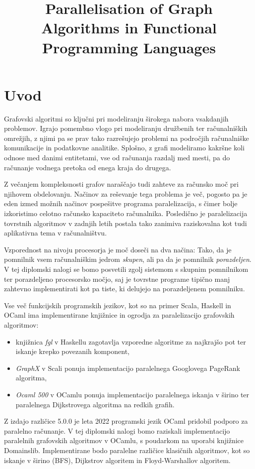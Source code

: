 \documentclass[fin1, tisk]{fmfdelo}
\title{Parallelisation of Graph Algorithms in Functional Programming Languages}
\begin{document}
\section{Uvod}

Grafovski algoritmi so ključni pri modeliranju širokega nabora vsakdanjih problemov.
Igrajo pomembno vlogo pri modeliranju družbenih ter računalniških omrežjih, z njimi pa se prav tako razrešujejo 
problemi na področjih računalniške komunikacije in podatkovne analitike. Splošno, z grafi  modeliramo kakršne 
koli odnose med danimi entitetami, vse od računanja razdalj med mesti, pa do računanje vodnega pretoka
od enega kraja do drugega.

Z večanjem kompleksnosti grafov naraščajo tudi zahteve za računsko moč pri njihovem obdelovanju.
Načinov za reševanje tega problema je več, pogosto pa je eden izmed možnih načinov pospešitve programa paralelizacija,
s čimer bolje izkoristimo celotno računsko kapaciteto računalnika. Posledično je paralelizacija tovrstnih algoritmov
v zadnjih letih postala tako zanimiva raziskovalna kot tudi aplikativna tema v računalništvu.

Vzporednost na nivoju procesorja je moč doseči na dva načina: 
Tako, da je pomnilnik vsem računalniškim jedrom \textit{skupen}, ali pa da je pomnilnik \textit{porazdeljen}. 
V tej diplomski nalogi se bomo posvetili zgolj sistemom s skupnim pomnilnikom ter porazdeljeno procesorsko močjo, 
saj je tovrstne programe tipično manj zahtevno implementirati kot pa tiste, ki delujejo na porazdeljenem pomnilniku.

Vse več funkcijskih programskih jezikov, kot so na primer Scala, Haskell in OCaml ima implementirane knjižnice
in ogrodja za paralelizacijo grafovskih algoritmov:
\begin{itemize}
    \item knjižnica \textit{fgl} v Haskellu \cite{haskell_fgl} zagotavlja vzporedne algoritme za najkrajšo pot 
    ter iskanje krepko povezanih komponent,
    \item \textit{GraphX} v Scali \cite{graphx} ponuja implementacijo paralelnega Googlovega PageRank algoritma,
    \item \textit{Ocaml 500} v OCamlu \cite{ocaml_multicore_500} ponuja implementacijo paralelnega iskanja v širino ter paralelnega Dijkstrovega algoritma na redkih grafih.
\end{itemize}

Z izdajo različice 5.0.0 je leta 2022 programski jezik OCaml pridobil podporo za paralelno računanje.
V tej diplomski nalogi bomo raziskali implementacijo paralelnih grafovskih algoritmov v OCamlu, s
poudarkom na uporabi knjižnice Domainslib. Implementirane bodo paralelne različice klasičnih algoritmov, kot so
iskanje v širino (BFS), Dijkstrov algoritem in Floyd-Warshallov algoritem.
\end{document}

